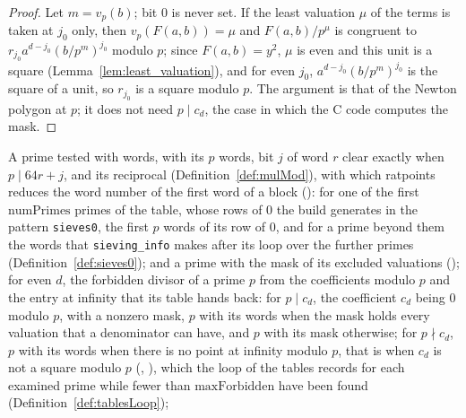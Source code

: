 \begin{proof}
  \leanok
  Let $m = v_p(b)$; bit $0$ is never set. If the least valuation $\mu$ of the terms is taken at
  $j_0$ only, then $v_p(F(a, b)) = \mu$ and $F(a, b) / p^{\mu}$ is congruent to
  $r_{j_0} a^{d - j_0} (b / p^m)^{j_0}$ modulo $p$; since $F(a, b) = y^2$, $\mu$ is even and this
  unit is a square (Lemma~\ref{lem:least_valuation}), and for even $j_0$,
  $a^{d - j_0} (b / p^m)^{j_0}$ is the square of a unit, so $r_{j_0}$ is a square modulo $p$. The
  argument is that of the Newton polygon at $p$; it does not need $p \mid c_d$, the case in which
  the C code computes the mask.
\end{proof}

\begin{definition}\label{def:forbidden}
  \leanok
  A prime tested with words, with its $p$ words, bit $j$ of word $r$ clear exactly when
  $p \mid 64 r + j$, and its reciprocal (Definition~\ref{def:mulMod}), with which ratpoints reduces
  the word number of the first word of a block (): for one of the
  first $\mathrm{numPrimes}$ primes of the table, whose rows of $0$ the build generates in the
  pattern \verb|sieves0|, the first $p$ words of its row of $0$, and for a prime beyond them the
  words that \verb|sieving_info| makes after its loop over the further primes
  (Definition~\ref{def:sieves0}); and a prime with the mask of its excluded valuations
  (); for even $d$, the forbidden divisor of a prime $p$ from the
  coefficients modulo $p$ and the entry at infinity that its table hands back: for $p \mid c_d$, the
  coefficient $c_d$ being $0$ modulo $p$, with a nonzero mask, $p$ with its words when the mask
  holds every valuation that a denominator can have, and $p$ with its mask otherwise; for
  $p \nmid c_d$, $p$ with its words when there is no point at infinity modulo $p$, that is when
  $c_d$ is not a square modulo $p$ (,
  ), which the loop of the tables records for each examined prime
  while fewer than $\mathrm{maxForbidden}$ have been found (Definition~\ref{def:tablesLoop});

\end{definition}

